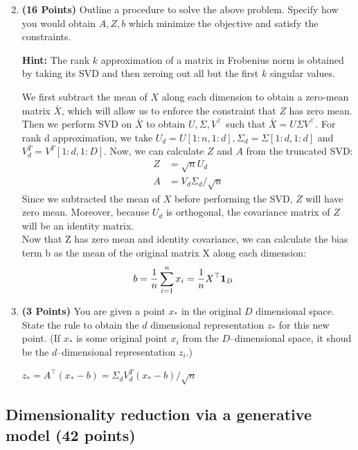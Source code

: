 \begin{enumerate}
\setcounter{enumi}{1}
\item \textbf{(16 Points)}
Outline a procedure to solve the above problem. Specify how you
would obtain $A, Z, b$ which minimize the objective and satisfy the constraints.

\textbf{Hint: }The rank $k$ approximation of a matrix in Frobenius norm is obtained by
taking its SVD and then zeroing out all but the first $k$ singular values.

\begin{soln}
  We first subtract the mean of $X$ along each dimension to obtain a zero-mean matrix $\bar{X}$, which will allow us to enforce the constraint that $Z$ has zero mean. Then we perform SVD on $\bar{X}$ to obtain $U, \Sigma, V^\top$ such that $\bar{X} = U\Sigma V^\top$. For rank d approximation, we take $U_d = U[1:n,1:d], \Sigma_d = \Sigma[1:d,1:d]$ and $V_d^T = V^T[1:d,1:D]$.
  Now, we can calculate $Z$ and $A$ from the truncated SVD:
  \begin{align*}
    Z &= \sqrt{n} U_d \\
    A &= V_d \Sigma_d / \sqrt{n}
  \end{align*}
  Since we subtracted the mean of $X$ before performing the SVD, $Z$ will have zero mean. Moreover, because $U_d$ is orthogonal, the covariance matrix of $Z$ will be an identity matrix. \\
  Now that Z has zero mean and identity covariance, we can calculate the bias term b as the mean of the original matrix X along each dimension:
  \begin{align*}
    b &= \frac{1}{n} \sum_{i=1}^n x_i = \frac{1}{n} X^\top {\bf 1}_D
  \end{align*}
\end{soln}

\item \textbf{(3 Points)}
You are given a point $x_*$ in the original $D$ dimensional space.
State the rule to obtain the $d$ dimensional
representation $z_*$ for this new point.
(If $x_*$ is some original point $x_i$ from the $D$--dimensional space, it shoud be the
$d$--dimensional representation $z_i$.)

\begin{soln}
  $z_* = A^\top (x_* - b) = \Sigma_d V_d^T (x_* - b) / \sqrt{n}$
\end{soln}

\end{enumerate}


\subsection{Dimensionality reduction via a generative model (42 points)}

